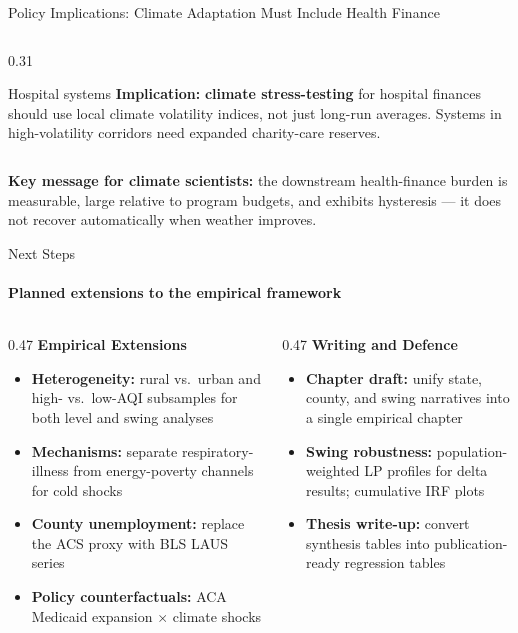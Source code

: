 \documentclass[aspectratio=169,11pt]{beamer}
\newcommand{\emphcolor}[1]{{\color{WarmOrange}\textbf{#1}}}
\newcommand{\tealtext}[1]{{\color{Teal}#1}}
\newcommand{\graytext}[1]{{\color{WarmGray}#1}}
\begin{document}
\begin{frame}{Policy Implications: Climate Adaptation Must Include Health Finance}
\begin{columns}[T]
\begin{column}{0.31\textwidth}
\begin{block}{Hospital systems}
        \textbf{Implication:} \emphcolor{climate stress-testing} for hospital finances should use local climate volatility indices, not just long-run averages. Systems in high-volatility corridors need expanded charity-care reserves.
      \end{block}
    \end{column}
  \end{columns}
  \vspace{0.3em}
  \graytext{\scriptsize \textbf{Key message for climate scientists:} the downstream health-finance burden is measurable, large relative to program budgets, and exhibits hysteresis --- it does not recover automatically when weather improves.}
\end{frame}

\begin{frame}{Next Steps}
  \framesubtitle{Planned extensions to the empirical framework}
  \begin{columns}[T]
    \begin{column}{0.47\textwidth}
      \textbf{\tealtext{Empirical Extensions}}\\[-0.1em]
      \footnotesize
      \begin{itemize}\itemsep0.18em
        \item \emphcolor{Heterogeneity:} rural vs.\ urban and high- vs.\ low-AQI subsamples for both level and swing analyses
        \item \emphcolor{Mechanisms:} separate respiratory-illness from energy-poverty channels for cold shocks
        \item \emphcolor{County unemployment:} replace the ACS proxy with BLS LAUS series
        \item \emphcolor{Policy counterfactuals:} ACA Medicaid expansion $\times$ climate shocks
      \end{itemize}
    \end{column}
    \begin{column}{0.47\textwidth}
      \textbf{\tealtext{Writing and Defence}}\\[-0.1em]
      \footnotesize
      \begin{itemize}\itemsep0.18em
        \item \emphcolor{Chapter draft:} unify state, county, and swing narratives into a single empirical chapter
        \item \emphcolor{Swing robustness:} population-weighted LP profiles for delta results; cumulative IRF plots
        \item \emphcolor{Thesis write-up:} convert synthesis tables into publication-ready regression tables
      \end{itemize}
    \end{column}
  \end{columns}
\end{frame}
\end{document}
